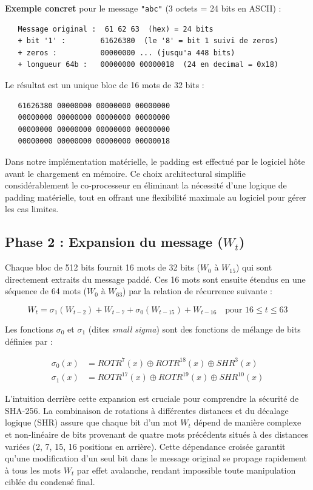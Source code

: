 \textbf{Exemple concret} pour le message \texttt{"abc"} (3 octets = 24 bits en ASCII) :

\begin{verbatim}
   Message original :  61 62 63  (hex) = 24 bits
   + bit '1' :        61626380  (le '8' = bit 1 suivi de zeros)
   + zeros :          00000000 ... (jusqu'a 448 bits)
   + longueur 64b :   00000000 00000018  (24 en decimal = 0x18)
\end{verbatim}

Le résultat est un unique bloc de 16 mots de 32 bits :
\begin{verbatim}
   61626380 00000000 00000000 00000000
   00000000 00000000 00000000 00000000
   00000000 00000000 00000000 00000000
   00000000 00000000 00000000 00000018
\end{verbatim}

Dans notre implémentation matérielle, le padding est effectué par le logiciel hôte avant le chargement en mémoire. Ce choix architectural simplifie considérablement le co-processeur en éliminant la nécessité d'une logique de padding matérielle, tout en offrant une flexibilité maximale au logiciel pour gérer les cas limites.

\subsection{Phase 2 : Expansion du message ($W_t$)}

Chaque bloc de 512 bits fournit 16 mots de 32 bits ($W_0$ à $W_{15}$) qui sont directement extraits du message paddé. Ces 16 mots sont ensuite étendus en une séquence de 64 mots ($W_0$ à $W_{63}$) par la relation de récurrence suivante :

\begin{equation}
W_t = \sigma_1(W_{t-2}) + W_{t-7} + \sigma_0(W_{t-15}) + W_{t-16}
\quad \text{pour } 16 \leq t \leq 63
\label{eq:expansion}
\end{equation}

Les fonctions $\sigma_0$ et $\sigma_1$ (dites \emph{small sigma}) sont des fonctions de mélange de bits définies par :

\begin{align}
\sigma_0(x) &= ROTR^{7}(x) \oplus ROTR^{18}(x) \oplus SHR^{3}(x) \label{eq:ssig0} \\
\sigma_1(x) &= ROTR^{17}(x) \oplus ROTR^{19}(x) \oplus SHR^{10}(x) \label{eq:ssig1}
\end{align}

L'intuition derrière cette expansion est cruciale pour comprendre la sécurité de SHA-256. La combinaison de rotations à différentes distances et du décalage logique (SHR) assure que chaque bit d'un mot $W_t$ dépend de manière complexe et non-linéaire de bits provenant de quatre mots précédents situés à des distances variées (2, 7, 15, 16 positions en arrière). Cette dépendance croisée garantit qu'une modification d'un seul bit dans le message original se propage rapidement à tous les mots $W_t$ par effet avalanche, rendant impossible toute manipulation ciblée du condensé final.

